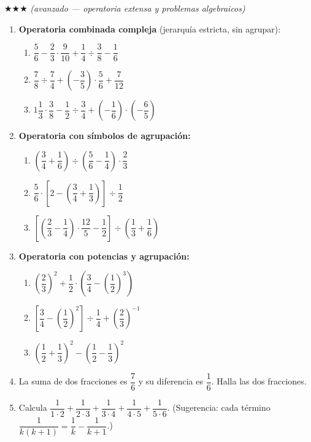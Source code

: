 \documentclass[11pt, letterpaper]{article}
\begin{document}
$\bigstar\bigstar\bigstar$ \textit{(avanzado --- operatoria extensa y problemas algebraicos)}

\begin{enumerate}[label=\textbf{\arabic*.}, leftmargin=*, resume]

\item \textbf{Operatoria combinada compleja} (jerarqu\'ia estricta, sin agrupar):
\begin{enumerate}[label=\alph*)]
  \item $\dfrac{5}{6} - \dfrac{2}{3}\cdot\dfrac{9}{10} + \dfrac{1}{4}\div\dfrac{3}{8} - \dfrac{1}{6}$
  \item $\dfrac{7}{8}\div\dfrac{7}{4} + \left(-\dfrac{3}{5}\right)\cdot\dfrac{5}{6} + \dfrac{7}{12}$
  \item $1\dfrac{1}{3}\cdot\dfrac{3}{8} - \dfrac{1}{2}\div\dfrac{3}{4} + \left(-\dfrac{1}{6}\right)\cdot\left(-\dfrac{6}{5}\right)$
\end{enumerate}

\item \textbf{Operatoria con s\'imbolos de agrupaci\'on:}
\begin{enumerate}[label=\alph*)]
  \item $\left(\dfrac{3}{4}+\dfrac{1}{6}\right)\div\left(\dfrac{5}{6}-\dfrac{1}{4}\right)\cdot\dfrac{2}{3}$
  \item $\dfrac{5}{6}\cdot\left[2-\left(\dfrac{3}{4}+\dfrac{1}{3}\right)\right]\div\dfrac{1}{2}$
  \item $\left[\left(\dfrac{2}{3}-\dfrac{1}{4}\right)\cdot\dfrac{12}{5} - \dfrac{1}{2}\right]\div\left(\dfrac{1}{3}+\dfrac{1}{6}\right)$
\end{enumerate}

\item \textbf{Operatoria con potencias y agrupaci\'on:}
\begin{enumerate}[label=\alph*)]
  \item $\left(\dfrac{2}{3}\right)^2 + \dfrac{1}{2}\cdot\left(\dfrac{3}{4} - \left(\dfrac{1}{2}\right)^3\right)$
  \item $\left[\dfrac{3}{4} - \left(\dfrac{1}{2}\right)^2\right]\div\dfrac{1}{4} + \left(\dfrac{2}{3}\right)^{-1}$
  \item $\left(\dfrac{1}{2}+\dfrac{1}{3}\right)^2 - \left(\dfrac{1}{2}-\dfrac{1}{3}\right)^2$
\end{enumerate}

\item La suma de dos fracciones es $\dfrac{7}{6}$ y su diferencia es $\dfrac{1}{6}$. Halla las dos fracciones.

\item Calcula $\dfrac{1}{1\cdot2}+\dfrac{1}{2\cdot3}+\dfrac{1}{3\cdot4}+\dfrac{1}{4\cdot5}+\dfrac{1}{5\cdot6}$. (Sugerencia: cada t\'ermino $\dfrac{1}{k(k+1)}=\dfrac{1}{k}-\dfrac{1}{k+1}$.)

\end{enumerate}
\end{document}
